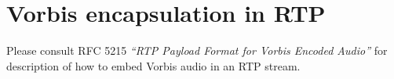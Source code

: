 \section{Vorbis encapsulation in RTP} \label{vorbis:over:rtp}


Please consult RFC 5215 \textit{``RTP Payload Format for Vorbis Encoded
    Audio''} for description of how to embed Vorbis audio in an RTP stream.
